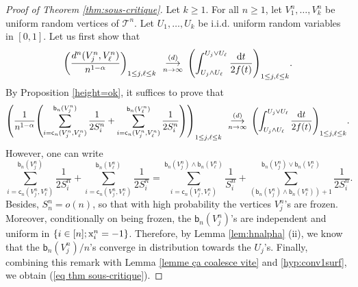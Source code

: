 \documentclass[11pt]{article}
\theoremstyle{plain}
\theoremstyle{definition}
\theoremstyle{remark}
\newcommand{\1}{\mathbbm{1}} %
\newcommand{\T}{\mathcal{T}} %
\newcommand{\birth}{\mathsf{b}} %
\newcommand{\coal}{\mathsf{c}} %
\newcommand{\X}{\mathrm x} %
\newcommand{\cvloi}[1][n]{\enskip\mathop{\longrightarrow}^{(d)}_{#1 \to \infty}\enskip}
\let\originalleft\left
\let\originalright\right
\renewcommand{\left}{\mathopen{}\mathclose\bgroup\originalleft}
\renewcommand{\right}{\aftergroup\egroup\originalright}
\begin{document}
\begin{proof}[Proof of Theorem \ref{thm:sous-critique}]
Let $k\ge 1$. For all $n\ge 1$, let $V^n_1,\ldots,V^n_k$ be uniform random vertices of $\T^n$. Let $U_1,\ldots, U_k$ be i.i.d. uniform random variables in $[0,1]$. Let us first show that 
\[
\left(\frac{d^n(V^n_j,V^n_\ell)}{n^{1-\alpha}}\right)_{1\le j,\ell\le k} \cvloi[n] \left(\int_{U_{j}\wedge U_\ell}^{U_j \vee U_\ell} \frac{\mathrm{d}t}{2f(t)}\right)_{1\le j,\ell\le k}.
\]
By Proposition \ref{height=ok}, it suffices to prove that
\begin{equation}\label{eq thm sous-critique}
\left(\frac{1}{n^{1-\alpha}}\left(\sum_{i=\coal_n(V^n_j,V^n_\ell)}^{\birth_n(V^n_j)} \frac{1}{2S^n_i} 
+\sum_{i=\coal_n(V^n_j,V^n_\ell)}^{\birth_n(V^n_\ell)} \frac{1}{2S^n_i}
\right)\right)_{1\le j,\ell\le k} \cvloi[n] \left(\int_{U_{j}\wedge U_\ell}^{U_j \vee U_\ell} \frac{\mathrm{d}t}{2f(t)}\right)_{1\le j,\ell\le k}.
\end{equation}
However, one can write
\[
\sum_{i=\coal_n(V^n_j,V^n_\ell)}^{\birth_n(V^n_j)} \frac{1}{2S^n_i} 
+\sum_{i=\coal_n(V^n_j,V^n_\ell)}^{\birth_n(V^n_\ell)} \frac{1}{2S^n_i}
=\sum_{i=\coal_n(V^n_j,V^n_\ell)}^{\birth_n(V^n_j)\wedge \birth_n(V^n_\ell)} \frac{1}{S^n_i}
+\sum_{(\birth_n(V^n_j)\wedge \birth_n(V^n_\ell))+1}^{\birth_n(V^n_j)\vee\birth_n(V^n_\ell)} \frac{1}{2S^n_i}.
\]
Besides, $S^n_n=o(n)$, so that with high probability the vertices $V^n_j$'s are frozen. Moreover, conditionally on being frozen, the $\birth_n(V^n_j)$'s are independent and uniform in $\left\{i \in [n]; \X_i^n=-1\right\}$. Therefore, by Lemma \ref{lem:hnalpha} (ii), we know that the $\birth_n(V^n_j)/n$'s converge in distribution towards the $U_j$'s. Finally, combining this remark with Lemma \ref{lemme ça coalesce vite} and \ref{hyp:conv1surf}, we obtain (\ref{eq thm sous-critique}).


\end{proof}
\end{document}
